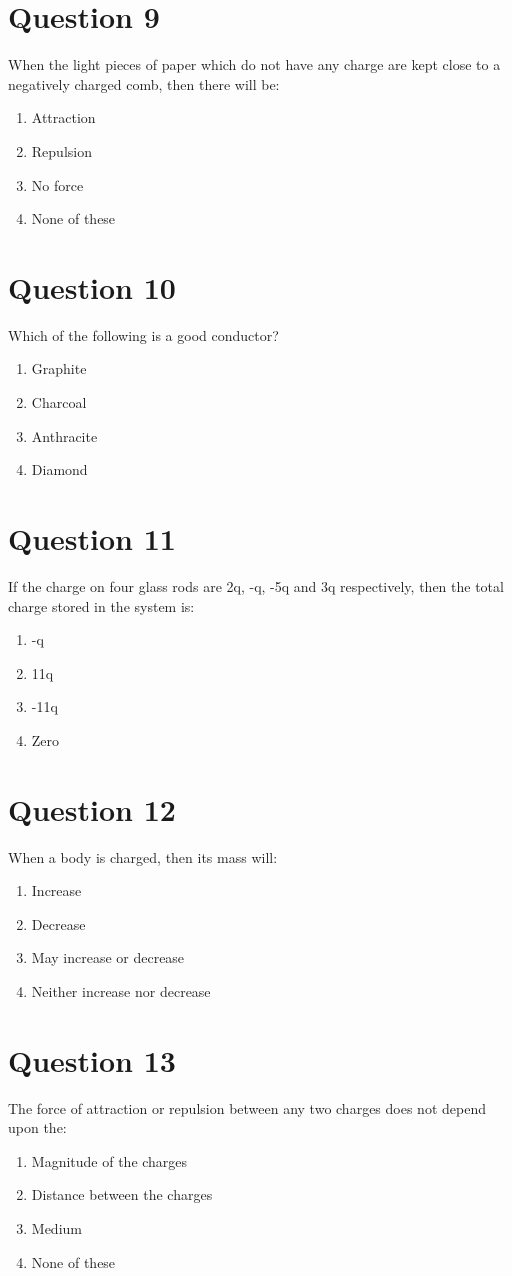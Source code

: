 \documentclass{article}
\begin{document}
\section*{Question 9}
When the light pieces of paper which do not have any charge are kept close to a negatively charged comb, then there will be:
\begin{enumerate}[label=(\alph*)]
\item Attraction
\item Repulsion
\item No force
\item None of these
\end{enumerate}
\newpage
\section*{Question 10}
Which of the following is a good conductor?
\begin{enumerate}[label=(\alph*)]
\item Graphite
\item Charcoal
\item Anthracite
\item Diamond
\end{enumerate}
\newpage
\section*{Question 11}
If the charge on four glass rods are 2q, -q, -5q and 3q respectively, then the total charge stored in the system is:
\begin{enumerate}[label=(\alph*)]
\item -q
\item 11q
\item -11q
\item Zero
\end{enumerate}
\newpage
\section*{Question 12}
When a body is charged, then its mass will:
\begin{enumerate}[label=(\alph*)]
\item Increase
\item Decrease
\item May increase or decrease
\item Neither increase nor decrease
\end{enumerate}
\newpage
\section*{Question 13}
The force of attraction or repulsion between any two charges does not depend upon the:
\begin{enumerate}[label=(\alph*)]
\item Magnitude of the charges
\item Distance between the charges
\item Medium
\item None of these
\end{enumerate}
\newpage
\end{document}
